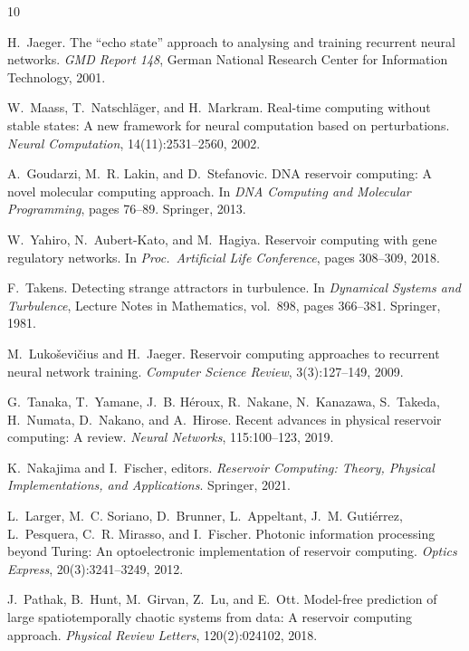 \documentclass[11pt,twocolumn]{article}
\begin{document}

% 

\begin{thebibliography}{10}

H.~Jaeger.
\newblock The ``echo state'' approach to analysing and training recurrent
  neural networks.
\newblock \emph{GMD Report 148}, German National Research Center for
  Information Technology, 2001.

W.~Maass, T.~Natschl{\"a}ger, and H.~Markram.
\newblock Real-time computing without stable states: A new framework for
  neural computation based on perturbations.
\newblock \emph{Neural Computation}, 14(11):2531--2560, 2002.

A.~Goudarzi, M.~R. Lakin, and D.~Stefanovic.
\newblock DNA reservoir computing: A novel molecular computing approach.
\newblock In \emph{DNA Computing and Molecular Programming}, pages 76--89.
  Springer, 2013.

W.~Yahiro, N.~Aubert-Kato, and M.~Hagiya.
\newblock Reservoir computing with gene regulatory networks.
\newblock In \emph{Proc.\ Artificial Life Conference}, pages 308--309, 2018.

F.~Takens.
\newblock Detecting strange attractors in turbulence.
\newblock In \emph{Dynamical Systems and Turbulence}, Lecture Notes in
  Mathematics, vol.~898, pages 366--381. Springer, 1981.

M.~Luko{\v{s}}evi{\v{c}}ius and H.~Jaeger.
\newblock Reservoir computing approaches to recurrent neural network training.
\newblock \emph{Computer Science Review}, 3(3):127--149, 2009.

G.~Tanaka, T.~Yamane, J.~B. H{\'e}roux, R.~Nakane, N.~Kanazawa,
  S.~Takeda, H.~Numata, D.~Nakano, and A.~Hirose.
\newblock Recent advances in physical reservoir computing: A review.
\newblock \emph{Neural Networks}, 115:100--123, 2019.

K.~Nakajima and I.~Fischer, editors.
\newblock \emph{Reservoir Computing: Theory, Physical Implementations, and
  Applications}.
\newblock Springer, 2021.

L.~Larger, M.~C. Soriano, D.~Brunner, L.~Appeltant, J.~M. Guti{\'e}rrez,
  L.~Pesquera, C.~R. Mirasso, and I.~Fischer.
\newblock Photonic information processing beyond Turing: An optoelectronic
  implementation of reservoir computing.
\newblock \emph{Optics Express}, 20(3):3241--3249, 2012.

J.~Pathak, B.~Hunt, M.~Girvan, Z.~Lu, and E.~Ott.
\newblock Model-free prediction of large spatiotemporally chaotic systems from
  data: A reservoir computing approach.
\newblock \emph{Physical Review Letters}, 120(2):024102, 2018.

\end{thebibliography}
\end{document}
